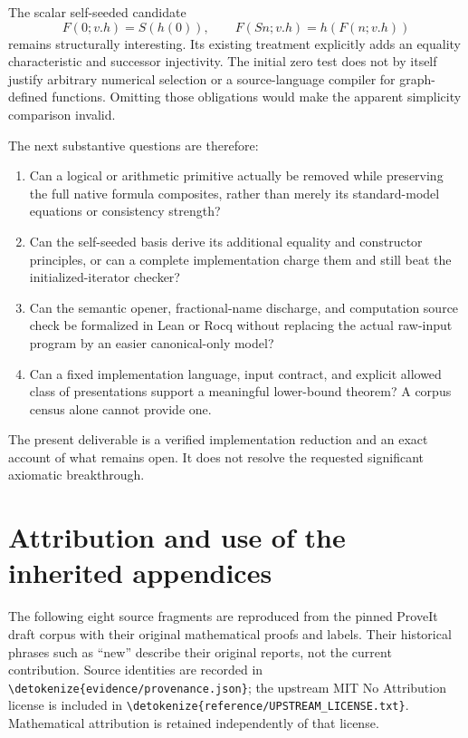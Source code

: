 \documentclass[11pt,letterpaper]{article}
\theoremstyle{definition}\newtheorem{definition}[theorem]{Definition}
\theoremstyle{remark}\newtheorem{remark}[theorem]{Remark}
\newcommand{\file}[1]{\expandafter\nolinkurl\expandafter{\detokenize{#1}}}
\begin{document}
The scalar self-seeded candidate
\[
 F(0;v.h)=S(h(0)),\qquad F(Sn;v.h)=h(F(n;v.h))
\]
remains structurally interesting. Its existing treatment explicitly adds an
equality characteristic and successor injectivity. The initial zero test
does not by itself justify arbitrary numerical selection or a source-language
compiler for graph-defined functions. Omitting those obligations would make
the apparent simplicity comparison invalid.

The next substantive questions are therefore:
\begin{enumerate}
\item Can a logical or arithmetic primitive actually be removed while
      preserving the full native formula composites, rather than merely its
      standard-model equations or consistency strength?
\item Can the self-seeded basis derive its additional equality and constructor
      principles, or can a complete implementation charge them and still beat
      the initialized-iterator checker?
\item Can the semantic opener, fractional-name discharge, and computation
      source check be formalized in Lean or Rocq without replacing the actual
      raw-input program by an easier canonical-only model?
\item Can a fixed implementation language, input contract, and explicit allowed
      class of presentations support a meaningful lower-bound theorem? A
      corpus census alone cannot provide one.
\end{enumerate}

The present deliverable is a verified implementation reduction and an exact
account of what remains open. It does not resolve the requested significant
axiomatic breakthrough.

\clearpage
\appendix
\section*{Attribution and use of the inherited appendices}

The following eight source fragments are reproduced from the pinned ProveIt
draft corpus with their original mathematical proofs and labels. Their
historical phrases such as ``new'' describe their original reports, not the
current contribution. Source identities are recorded in
\file{evidence/provenance.json}; the upstream MIT No Attribution license is
included in \file{reference/UPSTREAM_LICENSE.txt}. Mathematical attribution is
retained independently of that license.
\end{document}

